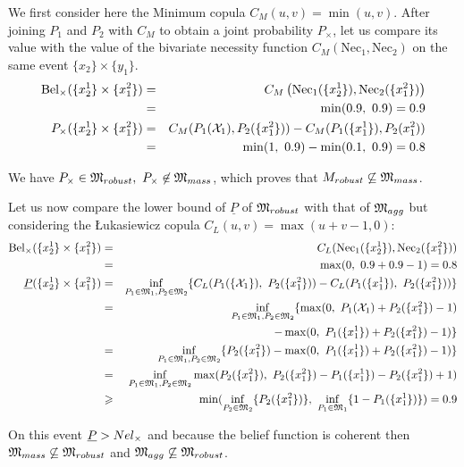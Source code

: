 \begin{example}
    We first consider here the Minimum copula $C_M(u,v)=\min(u,v)$. After joining $P_1$ and $P_2$ with $C_M$ to obtain a joint probability $P_\times$, let us compare its value with the value of the bivariate necessity function $C_M(\mathrm{Nec}_1, \mathrm{Nec}_2)$ on the same event $\{x_2\}\times\{y_1\}$.
    \begin{eqnarray*}
        \mathrm{Bel}_\times(\{x^1_2\}\times\{x^2_1\}) &=& C_M\left(\mathrm{Nec}_1(\{x^1_2\}), \mathrm{Nec}_2(\{x^2_1\})\right)\\
        &=& \min(0.9,~0.9) = 0.9\\
        P_\times(\{x^1_2\}\times\{x^2_1\}) &=& C_M(P_1({\mathcal{X}}_1), P_2(\{x^2_1\})) - C_M(P_1(\{x^1_1\}),P_2(x^2_1))\\
        &=& \min(1,~0.9) - \min(0.1,~0.9) = 0.8
    \end{eqnarray*}
    
    We have $P_\times\in{\mathfrak{M}}_{robust}, ~P_\times\not\in{\mathfrak{M}}_{mass}$, which proves that ${M}_{robust}\not\subseteq{\mathfrak{M}}_{mass}$.
    
    Let us now compare the lower bound of $\underline{P}$ of ${\mathfrak{M}}_{robust}$ with that of ${\mathfrak{M}}_{agg}$ but considering the \L ukasiewicz copula $C_L(u,v)=\max(u+v-1,0)$:
    \begin{eqnarray*}
        \mathrm{Bel}_\times(\{x^1_2\}\times\{x^2_1\}) &=& C_L(\mathrm{Nec}_1(\{x^1_2\}), \mathrm{Nec}_2(\{x^2_1\}))\\
        &=& \max(0,~0.9 + 0.9 - 1) = 0.8\\
        {\underline{P}}(\{x^1_2\}\times\{x^2_1\}) &=& \inf_{P_1\in{\mathfrak{M}}_1, P_2\in{\mathfrak{M}}_2}\{C_L(P_1(\{{\mathcal{X}}_1\}),~P_2(\{x^2_1\})) - C_L(P_1(\{x^1_1\}),~P_2(\{x^2_1\}))\}\\
        &=& \inf_{P_1\in{\mathfrak{M}}_1, P_2\in{\mathfrak{M}}_2}\{\max(0,~P_1({\mathcal{X}}_1) + P_2(\{x^2_1\}) - 1)\\
        && - \max(0,~P_1(\{x^1_1\}) + P_2(\{x^2_1\}) -1)\}\\
        &=& \inf_{P_1\in{\mathfrak{M}}_1, P_2\in{\mathfrak{M}}_2}\{P_2(\{x^2_1\}) - \max(0,~P_1(\{x^1_1\}) + P_2(\{x^2_1\}) - 1 )\}\\
        &=& \inf_{P_1\in{\mathfrak{M}}_1, P_2\in{\mathfrak{M}}_2}\max(P_2(\{x^2_1\}),~P_2(\{x^2_1\})-P_1(\{x^1_1\}) - P_2(\{x^2_1\}) + 1 )\\
        &\geqslant& \min(\inf_{P_2\in{\mathfrak{M}}_2}\{P_2(\{x^2_1\})\},~\inf_{P_1\in{\mathfrak{M}}_1}\{1-P_1(\{x^1_1\})\}) = 0.9
    \end{eqnarray*}
    
    On this event ${\underline{P}}>Nel_\times$ and because the belief function is coherent then ${\mathfrak{M}}_{mass}\not\subseteq{\mathfrak{M}}_{robust}$ and ${\mathfrak{M}}_{agg}\not\subseteq{\mathfrak{M}}_{robust}$.
\end{example}

